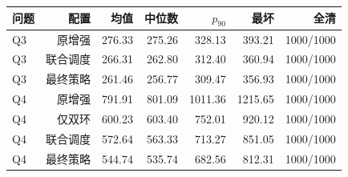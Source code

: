 \begin{tabular}{lrrrrrr}
\toprule
问题 & 配置 & 均值 & 中位数 & $p_{90}$ & 最坏 & 全清 \\
\midrule
Q3 & 原增强 & 276.33 & 275.26 & 328.13 & 393.21 & 1000/1000 \\
Q3 & 联合调度 & 266.31 & 262.80 & 312.40 & 360.94 & 1000/1000 \\
Q3 & 最终策略 & 261.46 & 256.77 & 309.47 & 356.93 & 1000/1000 \\
Q4 & 原增强 & 791.91 & 801.09 & 1011.36 & 1215.65 & 1000/1000 \\
Q4 & 仅双环 & 600.23 & 603.40 & 752.01 & 920.12 & 1000/1000 \\
Q4 & 联合调度 & 572.64 & 563.33 & 713.27 & 851.05 & 1000/1000 \\
Q4 & 最终策略 & 544.74 & 535.74 & 682.56 & 812.31 & 1000/1000 \\
\bottomrule
\end{tabular}
